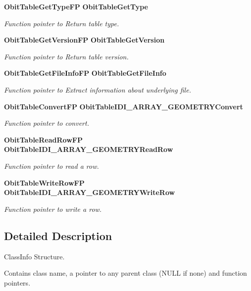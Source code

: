 \begin{CompactItemize}
{\bf Obit\-Table\-Get\-Type\-FP} {\bf Obit\-Table\-Get\-Type}
\begin{CompactList}\small\item\em Function pointer to Return table type. \item\end{CompactList}\item 
{\bf Obit\-Table\-Get\-Version\-FP} {\bf Obit\-Table\-Get\-Version}
\begin{CompactList}\small\item\em Function pointer to Return table version. \item\end{CompactList}\item 
{\bf Obit\-Table\-Get\-File\-Info\-FP} {\bf Obit\-Table\-Get\-File\-Info}
\begin{CompactList}\small\item\em Function pointer to Extract information about underlying file. \item\end{CompactList}\item 
{\bf Obit\-Table\-Convert\-FP} {\bf Obit\-Table\-IDI\_\-ARRAY\_\-GEOMETRYConvert}
\begin{CompactList}\small\item\em Function pointer to convert. \item\end{CompactList}\item 
{\bf Obit\-Table\-Read\-Row\-FP} {\bf Obit\-Table\-IDI\_\-ARRAY\_\-GEOMETRYRead\-Row}
\begin{CompactList}\small\item\em Function pointer to read a row. \item\end{CompactList}\item 
{\bf Obit\-Table\-Write\-Row\-FP} {\bf Obit\-Table\-IDI\_\-ARRAY\_\-GEOMETRYWrite\-Row}
\begin{CompactList}\small\item\em Function pointer to write a row. \item\end{CompactList}\end{CompactItemize}


\subsection{Detailed Description}
Class\-Info Structure. 

Contains class name, a pointer to any parent class (NULL if none) and function pointers. 



